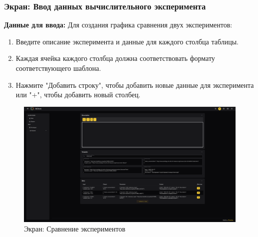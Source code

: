 \documentclass[a4paper,12pt,reqno]{article}
\begin{document}
\subsubsection{Экран: Ввод данных вычислительного эксперимента}
\textbf{Данные для ввода:}  
Для создания графика сравнения двух экспериментов:
\begin{enumerate}
    \item Введите описание эксперимента и данные для каждого столбца таблицы. 
    \item Каждая ячейка каждого столбца должна соответствовать формату соответствующего шаблона.
    \item Нажмите "Добавить строку", чтобы добавить новые данные для эксперимента или "+", чтобы добавить новый столбец.
\end{enumerate}
\begin{figure}[H]
    \centering
    \includegraphics[width=\textwidth]{RO/img/comp_exp.png} %
    \caption{Экран: Сравнение экспериментов}
    \label{fig:comp_exp}
\end{figure}
\end{document}
